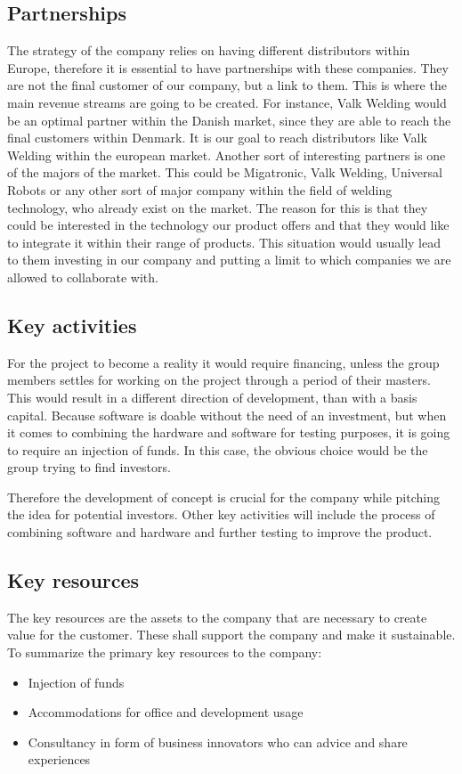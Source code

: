 \subsection{Partnerships}
The strategy of the company relies on having different distributors within Europe, therefore it is essential to have partnerships with these companies. They are not the final customer of our company, but a link to them. This is where the main revenue streams are going to be created.
For instance, Valk Welding would be an optimal partner within the Danish market, since they are able to reach the final customers within Denmark. It is our goal to reach distributors like Valk Welding within the european market.
Another sort of interesting partners is one of the majors of the market. This could be Migatronic, Valk Welding, Universal Robots or any other sort of major company within the field of welding technology, who already exist on the market. The reason for this is that they could be interested in the technology our product offers and that they would like to integrate it within their range of products. This situation would usually lead to them investing in our company and putting a limit to which companies we are allowed to collaborate with.

\subsection{Key activities}
For the project to become a reality it would require financing, unless the group members settles for working on the project through a period of their masters. This would result in a different direction of development, than with a basis capital. Because software is doable without the need of an investment, but when it comes to combining the hardware and software for testing purposes, it is going to require an injection of funds. In this case, the obvious choice would be the group trying to find investors.

Therefore the development of concept is crucial for the company while pitching the idea for potential investors. Other key activities will include the process of combining software and hardware and further testing to improve the product. 

\subsection{Key resources}
The key resources are the assets to the company that are necessary to create value for the customer. These shall support the company and make it sustainable.
To summarize the primary key resources to the company:
\begin{itemize}
\item Injection of funds
\item Accommodations for office and development usage
\item Consultancy in form of business innovators who can advice and share experiences
\end{itemize}

